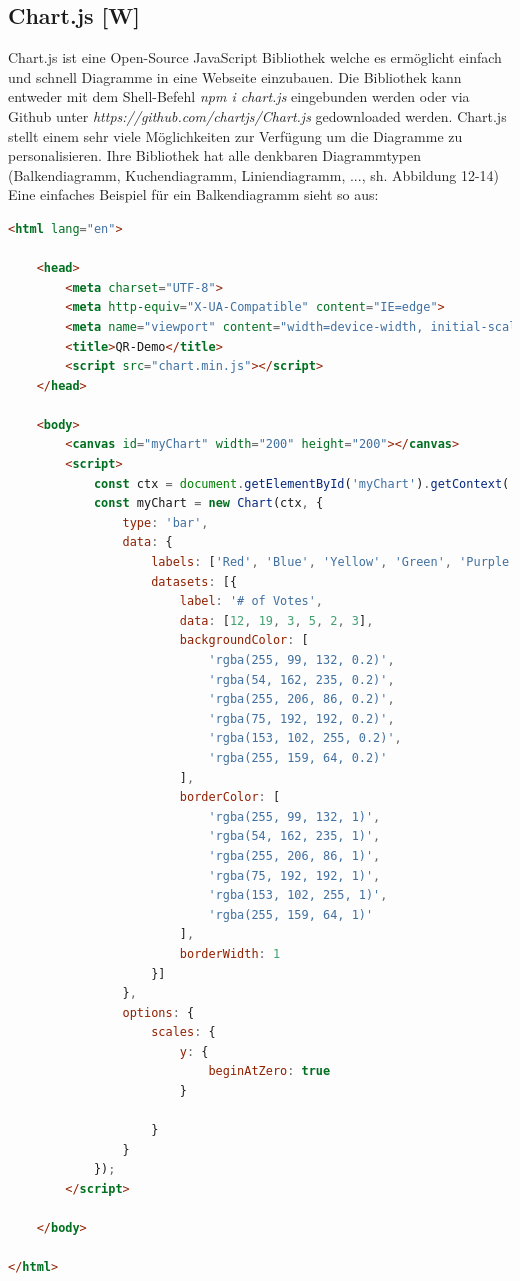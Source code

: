 \subsection{Chart.js [W]}
Chart.js ist eine Open-Source JavaScript Bibliothek welche es ermöglicht einfach und schnell Diagramme
in eine Webseite einzubauen. Die Bibliothek kann entweder mit dem Shell-Befehl \textit{npm i chart.js} eingebunden werden oder via Github unter
\textit{https://github.com/chartjs/Chart.js} gedownloaded werden. Chart.js stellt einem sehr
viele Möglichkeiten zur Verfügung um die Diagramme zu personalisieren.
Ihre Bibliothek hat alle denkbaren Diagrammtypen (Balkendiagramm, Kuchendiagramm, Liniendiagramm, ..., sh. Abbildung 12-14)
Eine einfaches Beispiel für ein Balkendiagramm sieht so aus:
\begin{lstlisting}[language=html,caption=Balkendiagramm HTML Code,label=lst:tech:gaussianBlur]
<html lang="en">

    <head>
        <meta charset="UTF-8">
        <meta http-equiv="X-UA-Compatible" content="IE=edge">
        <meta name="viewport" content="width=device-width, initial-scale=1.0">
        <title>QR-Demo</title>
        <script src="chart.min.js"></script>
    </head>

    <body>
        <canvas id="myChart" width="200" height="200"></canvas>
        <script>
            const ctx = document.getElementById('myChart').getContext('2d');
            const myChart = new Chart(ctx, {
                type: 'bar',
                data: {
                    labels: ['Red', 'Blue', 'Yellow', 'Green', 'Purple', 'Orange'],
                    datasets: [{
                        label: '# of Votes',
                        data: [12, 19, 3, 5, 2, 3],
                        backgroundColor: [
                            'rgba(255, 99, 132, 0.2)',
                            'rgba(54, 162, 235, 0.2)',
                            'rgba(255, 206, 86, 0.2)',
                            'rgba(75, 192, 192, 0.2)',
                            'rgba(153, 102, 255, 0.2)',
                            'rgba(255, 159, 64, 0.2)'
                        ],
                        borderColor: [
                            'rgba(255, 99, 132, 1)',
                            'rgba(54, 162, 235, 1)',
                            'rgba(255, 206, 86, 1)',
                            'rgba(75, 192, 192, 1)',
                            'rgba(153, 102, 255, 1)',
                            'rgba(255, 159, 64, 1)'
                        ],
                        borderWidth: 1
                    }]
                },
                options: {
                    scales: {
                        y: {
                            beginAtZero: true
                        }
                        
                    }
                }
            });
        </script>

    </body>

</html>
\end{lstlisting}
